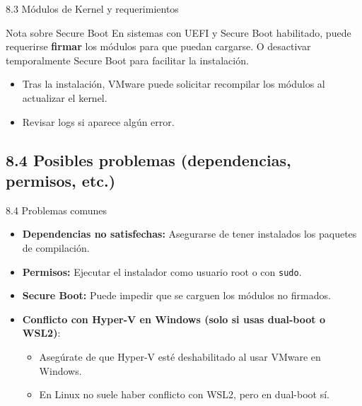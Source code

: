 \documentclass{beamer}
\begin{document}

\begin{frame}{8.3 Módulos de Kernel y requerimientos}
    \begin{block}{Nota sobre Secure Boot}
        En sistemas con UEFI y Secure Boot habilitado, puede requerirse \textbf{firmar} los módulos para que puedan cargarse.  
        O desactivar temporalmente Secure Boot para facilitar la instalación.
    \end{block}
    \begin{itemize}
        \item Tras la instalación, VMware puede solicitar recompilar los módulos al actualizar el kernel.
        \item Revisar logs si aparece algún error.
    \end{itemize}
\end{frame}

\subsection{8.4 Posibles problemas (dependencias, permisos, etc.)}
\begin{frame}{8.4 Problemas comunes}
    \begin{itemize}
        \item \textbf{Dependencias no satisfechas:} Asegurarse de tener instalados los paquetes de compilación.
        \item \textbf{Permisos:} Ejecutar el instalador como usuario root o con \texttt{sudo}.
        \item \textbf{Secure Boot:} Puede impedir que se carguen los módulos no firmados.
        \item \textbf{Conflicto con Hyper-V en Windows (solo si usas dual-boot o WSL2)}:
            \begin{itemize}
                \item Asegúrate de que Hyper-V esté deshabilitado al usar VMware en Windows.  
                \item En Linux no suele haber conflicto con WSL2, pero en dual-boot sí.
            \end{itemize}
    \end{itemize}
\end{frame}

\end{document}
